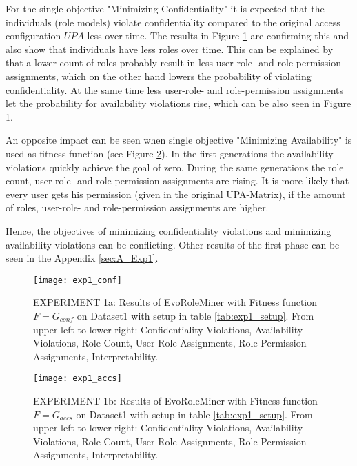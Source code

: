 For the single objective "Minimizing Confidentiality" it is expected that the individuals (role models) violate confidentiality compared to the original access configuration $UPA$ less over time. The results in Figure \ref{fig:exp1_conf} are confirming this and also show that individuals have less roles over time. This can be explained by that a lower count of roles probably result in less user-role- and role-permission assignments, which on the other hand lowers the probability of violating confidentiality. At the same time less user-role- and role-permission assignments let the probability for availability violations rise, which can be also seen in Figure \ref{fig:exp1_conf}.

An opposite impact can be seen when single objective "Minimizing Availability" is used as fitness function (see Figure \ref{fig:exp1_accs}). In the first generations the availability violations quickly achieve the goal of zero. During the same generations the role count, user-role- and role-permission assignments are rising. It is more likely that every user gets his permission (given in the original UPA-Matrix), if the amount of roles, user-role- and role-permission assignments are higher.

Hence, the objectives of minimizing confidentiality violations and minimizing availability violations can be conflicting. Other results of the first phase can be seen in the Appendix \ref{sec:A_Exp1}.

\begin{figure}[H]
    \centering
    \texttt{[image: exp1\_conf]}
    \caption{EXPERIMENT 1a: Results of EvoRoleMiner with Fitness function $F=G_{conf}$ on Dataset1 with setup in table \ref{tab:exp1_setup}. From upper left to lower right: Confidentiality Violations, Availability Violations, Role Count, User-Role Assignments, Role-Permission Assignments, Interpretability.}
    \label{fig:exp1_conf}
\end{figure}

\begin{figure}[H]
    \centering
    \texttt{[image: exp1\_accs]}
    \caption{EXPERIMENT 1b: Results of EvoRoleMiner with Fitness function $F=G_{accs}$ on Dataset1 with setup in table \ref{tab:exp1_setup}. From upper left to lower right: Confidentiality Violations, Availability Violations, Role Count, User-Role Assignments, Role-Permission Assignments, Interpretability.}
    \label{fig:exp1_accs}
\end{figure}